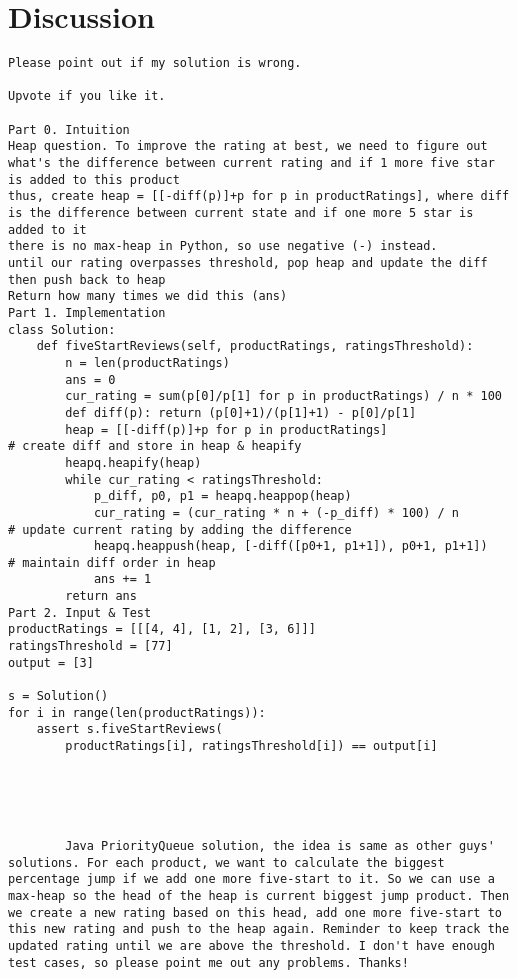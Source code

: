 \begin{QandA}
	\item 
	\begin{answered}
		\textit{}
	\end{answered}
	
\end{QandA}

\section{Discussion}
\label{five_starts_seller:sec:discussion}
\begin{verbatim}
Please point out if my solution is wrong.

Upvote if you like it.

Part 0. Intuition
Heap question. To improve the rating at best, we need to figure out what's the difference between current rating and if 1 more five star is added to this product
thus, create heap = [[-diff(p)]+p for p in productRatings], where diff is the difference between current state and if one more 5 star is added to it
there is no max-heap in Python, so use negative (-) instead.
until our rating overpasses threshold, pop heap and update the diff then push back to heap
Return how many times we did this (ans)
Part 1. Implementation
class Solution:
    def fiveStartReviews(self, productRatings, ratingsThreshold):
        n = len(productRatings)
        ans = 0
        cur_rating = sum(p[0]/p[1] for p in productRatings) / n * 100
        def diff(p): return (p[0]+1)/(p[1]+1) - p[0]/p[1]
        heap = [[-diff(p)]+p for p in productRatings]                     # create diff and store in heap & heapify
        heapq.heapify(heap)
        while cur_rating < ratingsThreshold:
            p_diff, p0, p1 = heapq.heappop(heap)
            cur_rating = (cur_rating * n + (-p_diff) * 100) / n           # update current rating by adding the difference
            heapq.heappush(heap, [-diff([p0+1, p1+1]), p0+1, p1+1])       # maintain diff order in heap
            ans += 1
        return ans
Part 2. Input & Test
productRatings = [[[4, 4], [1, 2], [3, 6]]]
ratingsThreshold = [77]
output = [3]

s = Solution()
for i in range(len(productRatings)):
    assert s.fiveStartReviews(
		productRatings[i], ratingsThreshold[i]) == output[i]
		




		Java PriorityQueue solution, the idea is same as other guys' solutions. For each product, we want to calculate the biggest percentage jump if we add one more five-start to it. So we can use a max-heap so the head of the heap is current biggest jump product. Then we create a new rating based on this head, add one more five-start to this new rating and push to the heap again. Reminder to keep track the updated rating until we are above the threshold. I don't have enough test cases, so please point me out any problems. Thanks!


\end{verbatim}
